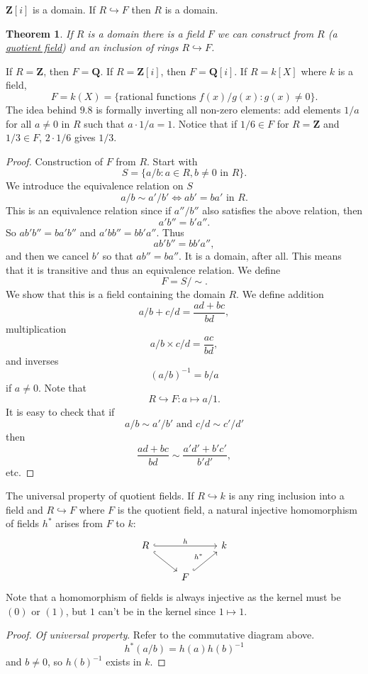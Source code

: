 \documentclass[11pt, oneside]{amsart}
\numberwithin{equation}{section}
\newtheorem{theorem}{Theorem}
\numberwithin{theorem}{section}
\theoremstyle{definition}
\def\Z{\mathbf{Z}}
\def\Q{\mathbf{Q}}
\begin{document}
{$\Z[i]$ is a domain. If $R\hookrightarrow F$ then $R$ is a domain. 
\begin{theorem}
If $R$ is a domain there is a field $F$ we can construct from $R$ (a \underline{quotient field}) and an inclusion of rings $R\hookrightarrow F$. 
\end{theorem}
If $R=\Z$, then $F=\Q$. If $R=\Z[i]$, then $F = \Q[i]$. If $R=k[X]$ where $k$ is a field, 
$$
F=  k(X) = \{\textrm{rational functions } f(x)/g(x) : g(x) \neq 0\}.
$$
The idea behind $9.8$ is formally inverting all non-zero elements: add elements $1/a$ for all $a\neq 0$ in $R$ such that $a\cdot 1/a = 1$. Notice that if $1/6\in F$ for $R=\Z$ and $1/3\in F$, $2\cdot1/6$ gives $1/3$.
\begin{proof}
Construction of $F$ from $R$. Start with 
$$
S = \{  a/b : a\in R, b\neq0 \textrm{ in } R  \}.
$$
We introduce the equivalence relation on $S$ 
$$
a/b \sim a'/b' \iff ab' = ba' \textrm{ in } R.
$$
This is an equivalence relation since if $a''/b''$ also satisfies the above relation, then 
$$
a'b'' = b'a''.
$$
So $ab'b'' = ba'b''$ and $a'bb'' = bb'a''$. Thus
$$
ab'b'' = bb'a'' ,
$$
and then we cancel $b'$ so that $ab'' = ba''$. It is a domain, after all. This means that it is transitive and thus an equivalence relation. We define 
$$
F = S/\sim.
$$
We show that this is a field containing the domain $R$. We define addition 
$$
a/b + c/d = \frac{ad+bc}{bd},
$$
multiplication
$$
a/b \times c/d =\frac{ac}{bd},
$$
and inverses
$$
(a/b)^{-1} = b/a
$$
if $a\neq 0$. Note that
$$
R\hookrightarrow F : a\mapsto a/1.
$$
It is easy to check that if 
$$
a/b\sim a'/b' \textrm { and } c/d \sim c'/d'
$$
then
$$
\frac{ad+bc}{bd}\sim \frac{a'd'+b'c'}{b'd'},
$$
etc. 
\end{proof}

The universal property of quotient fields. If $R\hookrightarrow k$ is any ring inclusion into a field and $R\hookrightarrow F$ where $F$ is the quotient field, a natural injective homomorphism of fields $h^*$ arises from $F$ to $k$:
$$
\begin{tikzcd}[]
R \arrow[hookrightarrow]{dr} \arrow[hookrightarrow]{rr}{h}
& & k \\
& F\arrow[hookrightarrow]{ur}{h^*} 
\end{tikzcd}
$$
Note that a homomorphism of fields is always injective as the kernel must be $(0)$ or $(1)$, but $1$ can't be in the kernel since $1\mapsto 1$.
\begin{proof}
\textit{Of universal property}. Refer to the commutative diagram above. 
$$
h^*(a/b) = h(a)h(b)^{-1}
$$
and $b\neq 0$, so $h(b)^{-1}$ exists in $k$.
\end{proof}

}
\end{document}
